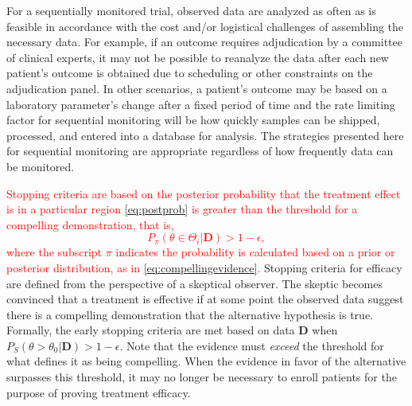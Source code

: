 \documentclass[12pt]{article}
\begin{document}
For a sequentially monitored trial, observed data are analyzed as often as is feasible in accordance with 
the cost and/or logistical challenges of assembling the necessary data.
%
For example, if an outcome requires adjudication by a committee of clinical experts, it may not be possible to reanalyze the
data after each new patient's outcome is obtained due to scheduling or other constraints on the adjudication panel.
%
In other scenarios, a patient's outcome may be based on a laboratory parameter's change after a fixed period of time
and the rate limiting factor for sequential monitoring will be how quickly samples can be shipped, processed, and entered
into a database for analysis.  
%
The strategies presented here for sequential monitoring are appropriate regardless of how frequently data can be monitored.


\textcolor{red}{Stopping criteria are based on the posterior probability that the treatment effect is in a particular region \eqref{eq:postprob} is greater than the threshold for a compelling demonstration, that is,
\begin{equation}\label{eq:convinced}
		P_\pi(\theta\in\Theta_i|\mathbf{D}) > 1-\epsilon,
\end{equation} 
where the subscript $\pi$ indicates the probability is calculated based on a prior or posterior distribution, as in \eqref{eq:compellingevidence}.
}
Stopping criteria for efficacy are defined from the perspective of a skeptical observer. 
The skeptic becomes convinced that a treatment is effective if at some point the observed data suggest there is 
a compelling demonstration that the alternative hypothesis is true. 
Formally, the early stopping criteria are met based on data $\mathbf{D}$ when $P_S(\theta>\theta_0|\mathbf{D})>1-\epsilon$.
Note that the evidence must \textit{exceed} the threshold for what defines it as being compelling.
When the evidence in favor of the alternative surpasses this threshold, it may no longer be necessary to 
enroll patients for the purpose of proving treatment efficacy.
\end{document}
